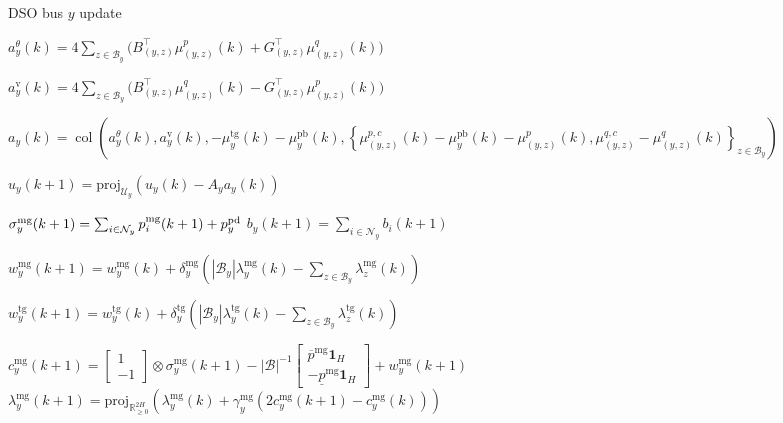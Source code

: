 \documentclass[10pt]{article}
\newtheorem{definitiox	n}{Definition}{\it}{}
\newcommand{\mc}{\mathcal}
\newcommand{\bb}{\mathbb}
\newcommand{\R}{\bb R}
\newcommand{\proj}{\mathrm{proj}}
\newcommand{\col}{\operatorname{col}}
\newcommand{\0}{\mathbf{0}}
\newcommand{\1}{\mathbf{1}}
\begin{document}
\begin{algorithm}[H]
\caption{DSO bus $y$ update}
\begin{algorithmic}[1]
\Statex
\Primal{}
\State
$
a^\theta_{y}(k) = 	
4	\sum_{z\in \mc B_y} \big( B_{(y,z)}^\top  \mu^p_{(y,z)}(k) + G_{(y,z)}^\top \mu^q_{(y,z)}(k) \big)$

\State
$
a^{\text{v}}_{y}(k) = 4	
	\sum_{z\in \mc B_y} \big( B_{(y,z)}^\top  \mu^q_{(y,z)}(k)  - G_{(y,z)}^\top \mu^p_{(y,z) }  (k) \big)$



\State
$
a_{y}(k) = \col \left( 	
	a^\theta_{y}(k),a^{\text{v}}_{y}(k),-\mu_y^{\text{tg}}(k) - \mu_y^{\text{pb}}(k), 
	\left\{ \mu^{p,c}_{(y,z)}(k) -\mu_y^{\text{pb}}(k) - \mu_{(y,z)}^p(k) ,  \mu^{q,c}_{(y,z)} -\mu_{(y,z)}^q(k) \right\}_{z \in \mc B_y}
	\right)$

\State 	$u_{y}(k+1) = \proj_{\mc U_{y}}  \left( u_{y}(k) - A_{y} a_{y}(k) \right)$
\EndPrimal

\Agg{}
\State
$ \sigma_y^{\text{mg}}(k+1) = \sum_{i \in \mc N_y} p_i^{\text{mg}}(k+1) + p_y^{\rm{pd}}$
\State
$b_y(k+1) = \sum_{i \in \mc N_y} b_i(k+1)$
\EndAgg


\Aux{}
\State
$ w_y^{\text{mg}}(k+1) = w_y^{\text{mg}}(k) + \delta^{\text{mg}}_y \left( |\mc B_y | \lambda^{\text{mg}}_y (k) - \sum_{z \in \mc B_y} \lambda^{\text{mg}}_z (k) \right) $

\State
$ w_y^{\text{tg}}(k+1) = w_y^{\text{tg}}(k) + \delta^{\text{tg}}_y \left( |\mc B_y | \lambda^{\text{tg}}_y (k) - \sum_{z \in \mc B_y} \lambda^{\text{tg}}_z (k) \right) $

\EndAux
\State



\State
$c^{\text{mg}}_{y}(k+1) = 
	\left[
	\begin{smallmatrix}
	1\\
	- 1 
	\end{smallmatrix}
	\right] \otimes \sigma_y^{\text{mg}}(k+1)
	-
	|\mc B|^{-1}
	\left[
	\begin{smallmatrix}
	\overline{p}^{\mathrm{mg}}\1_{H} \\
	-     \underline{p}^{\mathrm{mg}} \1_{H}
	\end{smallmatrix} 
	\right]  + w_y^{\text{mg}}(k+1)$
	\State
$\lambda_y^{\text{mg}}(k+1) = \textstyle
	\proj_{\R^{2 H}_{\geq 0}}\left( 
	\lambda_y^{\text{mg}}(k) + \gamma_y^{\text{mg}} (2c^{\text{mg}}_{y}(k+1)-c^{\text{mg}}_{y}(k)
	)
	 \right)$


\end{algorithmic}
\end{algorithm}
\end{document}

